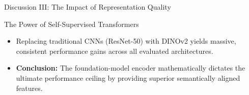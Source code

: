 \documentclass[aspectratio=169, 10pt]{beamer}
\begin{document}
\begin{frame}{Discussion III: The Impact of Representation Quality}
    \begin{table}[htbp]
    \centering
    \caption{Impact of Backbone Choice on COCO-$20^i$ (1-Shot mIoU \%)}
    \end{table}

    \begin{exampleblock}{The Power of Self-Supervised Transformers}
        \begin{itemize}
            \item Replacing traditional CNNs (ResNet-50) with DINOv2 yields massive, consistent performance gains across all evaluated architectures.
            \item \textbf{Conclusion:} The foundation-model encoder mathematically dictates the ultimate performance ceiling by providing superior semantically aligned features.
        \end{itemize}
    \end{exampleblock}
\end{frame}
\end{document}
